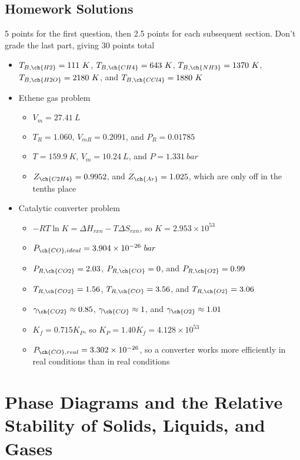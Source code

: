 \documentclass[12pt, openany, letterpaper]{memoir}
\begin{document}
\section*{Homework Solutions}
5 points for the first question, then 2.5 points for each subsequent section. Don't grade the last part, giving 30 points total
\begin{itemize}
	\item $T_{B,\ch{H2}} = 111~K$, $T_{B,\ch{CH4}} = 643~K$, $T_{B,\ch{NH3}} = 1370~K$, $T_{B,\ch{H2O}} = 2180~K$, and $T_{B,\ch{CCl4}} = 1880~K$
	\item Ethene gas problem
	\begin{itemize}
		\item $V_m=27.41~L$
		\item $T_R=1.060$, $V_{mR}=0.2091$, and $P_R=0.01785$
		\item $T=159.9~K$, $V_m=10.24~L$, and $P=1.331~bar$
		\item $Z_{\ch{C2H4}}=0.9952$, and $Z_{\ch{Ar}}=1.025$, which are only off in the tenths place
	\end{itemize}
	\item Catalytic converter problem
	\begin{itemize}
		\item $-RT\ln K = \Delta H_{rxn} - T\Delta S_{rxn}$, so $K=2.953\times10^{53}$
		\item $P_{\ch{CO}, ideal}=3.904\times10^{-26}~bar$
		\item $P_{R,\ch{CO2}} = 2.03$, $P_{R,\ch{CO}} = 0$, and $P_{R,\ch{O2}} = 0.99$
		\item $T_{R,\ch{CO2}} = 1.56$, $T_{R,\ch{CO}} = 3.56$,  and $T_{R,\ch{O2}} = 3.06$
		\item $\gamma_{\ch{CO2}} \approx 0.85$, $\gamma_{\ch{CO}} \approx1$, and $\gamma_{\ch{O2}} \approx 1.01$ 
		\item $K_f = 0.715K_P$, so $K_P=1.40K_f = 4.128\times10^{53}$
		\item $P_{\ch{CO}, real}=3.302\times10^{-26}$, so a converter works more efficiently in real conditions than in real conditions
	\end{itemize}
\end{itemize}
\chapter{Phase Diagrams and the Relative Stability of Solids, Liquids, and Gases}
\end{document}
